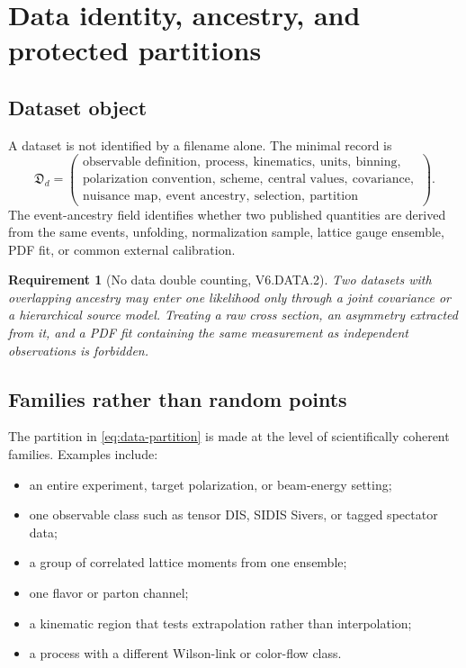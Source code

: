 \documentclass[11pt]{article}
\newtheorem{requirement}[definition]{Requirement}
\begin{document}
\section{Data identity, ancestry, and protected partitions}
\label{sec:data}

\subsection{Dataset object}

A dataset is not identified by a filename alone.  The minimal record is
\begin{equation}
 \mathfrak D_d=
 \left(
 \begin{gathered}
 \text{observable definition},\ \text{process},\ \text{kinematics},\
 \text{units},\ \text{binning},\\
 \text{polarization convention},\ \text{scheme},\ \text{central values},\
 \text{covariance},\\
 \text{nuisance map},\ \text{event ancestry},\ \text{selection},\
 \text{partition}
 \end{gathered}
 \right).
 \label{eq:dataset-object}
\end{equation}
The event-ancestry field identifies whether two published quantities are
derived from the same events, unfolding, normalization sample, lattice gauge
ensemble, PDF fit, or common external calibration.

\begin{requirement}[No data double counting, V6.DATA.2]
Two datasets with overlapping ancestry may enter one likelihood only through a
joint covariance or a hierarchical source model.  Treating a raw cross
section, an asymmetry extracted from it, and a PDF fit containing the same
measurement as independent observations is forbidden.
\end{requirement}

\subsection{Families rather than random points}

The partition in \cref{eq:data-partition} is made at the level of scientifically
coherent families.  Examples include:
\begin{itemize}
\item an entire experiment, target polarization, or beam-energy setting;
\item one observable class such as tensor DIS, SIDIS Sivers, or tagged
      spectator data;
\item a group of correlated lattice moments from one ensemble;
\item one flavor or parton channel;
\item a kinematic region that tests extrapolation rather than interpolation;
\item a process with a different Wilson-link or color-flow class.
\end{itemize}
\end{document}
